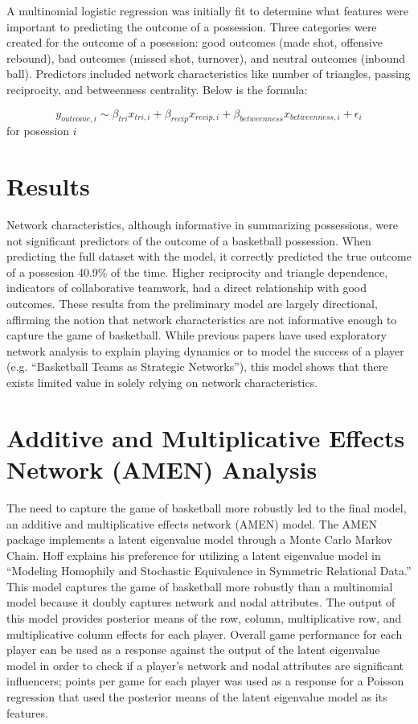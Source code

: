 \documentclass[12pt,twoside]{dukestatscithesis}
\theoremstyle{definition}
\theoremstyle{definition}
\theoremstyle{definition}
\theoremstyle{remark}
\begin{document}
A multinomial logistic regression was initially fit to determine what
features were important to predicting the outcome of a possession. Three
categories were created for the outcome of a posession: good outcomes
(made shot, offensive rebound), bad outcomes (missed shot, turnover),
and neutral outcomes (inbound ball). Predictors included network
characteristics like number of triangles, passing reciprocity, and
betweenness centrality. Below is the formula:

\[y_{outcome,i} \sim \beta_{tri}x_{tri,i} + \beta_{recip}x_{recip,i} + \beta_{betweenness}x_{betweenness,i} + \epsilon_{i}\]
for posession \(i\)

\section{Results}\label{results}

Network characteristics, although informative in summarizing
possessions, were not significant predictors of the outcome of a
basketball possession. When predicting the full dataset with the model,
it correctly predicted the true outcome of a possesion 40.9\% of the
time. Higher reciprocity and triangle dependence, indicators of
collaborative teamwork, had a direct relationship with good outcomes.
These results from the preliminary model are largely directional,
affirming the notion that network characteristics are not informative
enough to capture the game of basketball. While previous papers have
used exploratory network analysis to explain playing dynamics or to
model the success of a player (e.g. ``Basketball Teams as Strategic
Networks''), this model shows that there exists limited value in solely
relying on network characteristics.

\section{Additive and Multiplicative Effects Network (AMEN)
Analysis}\label{additive-and-multiplicative-effects-network-amen-analysis}

The need to capture the game of basketball more robustly led to the
final model, an additive and multiplicative effects network (AMEN)
model. The AMEN package implements a latent eigenvalue model through a
Monte Carlo Markov Chain. Hoff explains his preference for utilizing a
latent eigenvalue model in ``Modeling Homophily and Stochastic
Equivalence in Symmetric Relational Data.'' This model captures the game
of basketball more robustly than a multinomial model because it doubly
captures network and nodal attributes. The output of this model provides
posterior means of the row, column, multiplicative row, and
multiplicative column effects for each player. Overall game performance
for each player can be used as a response against the output of the
latent eigenvalue model in order to check if a player's network and
nodal attributes are significant influencers; points per game for each
player was used as a response for a Poisson regression that used the
posterior means of the latent eigenvalue model as its features.
\end{document}
